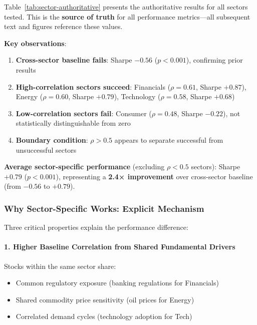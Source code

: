 Table~\ref{tab:sector-authoritative} presents the authoritative results for all sectors tested. This is the \textbf{source of truth} for all performance metrics—all subsequent text and figures reference these values.



\textbf{Key observations}:

\begin{enumerate}
    \item \textbf{Cross-sector baseline fails}: Sharpe $-0.56$ ($p < 0.001$), confirming prior results
    \item \textbf{High-correlation sectors succeed}: Financials ($\rho = 0.61$, Sharpe $+0.87$), Energy ($\rho = 0.60$, Sharpe $+0.79$), Technology ($\rho = 0.58$, Sharpe $+0.68$)
    \item \textbf{Low-correlation sectors fail}: Consumer ($\rho = 0.48$, Sharpe $-0.22$), not statistically distinguishable from zero
    \item \textbf{Boundary condition}: $\rho > 0.5$ appears to separate successful from unsuccessful sectors
\end{enumerate}

\textbf{Average sector-specific performance} (excluding $\rho < 0.5$ sectors): Sharpe $+0.79$ ($p < 0.001$), representing a \textbf{2.4× improvement} over cross-sector baseline (from $-0.56$ to $+0.79$).

\subsubsection{Why Sector-Specific Works: Explicit Mechanism}

Three critical properties explain the performance difference:

\paragraph{1. Higher Baseline Correlation from Shared Fundamental Drivers}

Stocks within the same sector share:
\begin{itemize}
    \item Common regulatory exposure (banking regulations for Financials)
    \item Shared commodity price sensitivity (oil prices for Energy)
    \item Correlated demand cycles (technology adoption for Tech)
\end{itemize}

